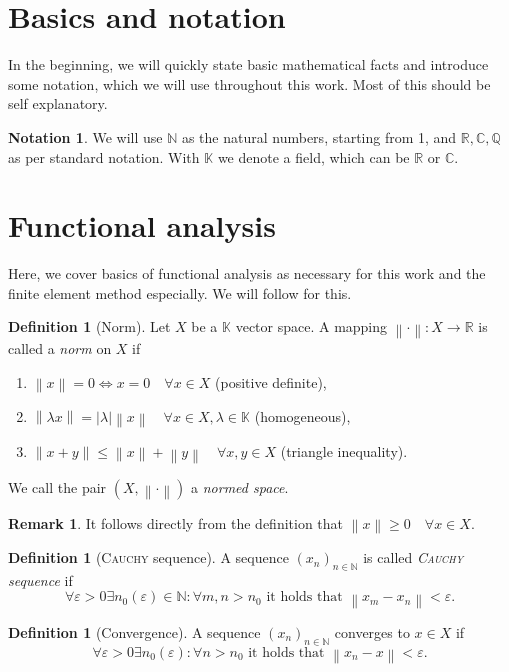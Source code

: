 \documentclass[12pt,a4paper,twoside, open=right]{scrreprt}
\theoremstyle{definition}
\newtheorem{rem}[auf]{Remark}
\newtheorem{defn}[auf]{Definition}
\newtheorem{notation}[auf]{Notation}
\theoremstyle{plain}
\newcommand{\abs}[1]{\left\vert #1\right\vert}
\newcommand{\rr}{\mathbb{R}}
\newcommand{\cc}{\mathbb{C}}
\newcommand{\kk}{\mathbb{K}}
\newcommand{\nn}{\mathbb{N}}
\newcommand{\qq}{\mathbb{Q}}
\newcommand{\norm}[1]{\left\lVert#1\right\rVert}
\begin{document}
\section{Basics and notation}
In the beginning, we will quickly state basic mathematical facts and introduce some notation, which we will use throughout this work. Most of this should be self explanatory.
\begin{notation}
    We will use $\nn$ as the natural numbers, starting from 1, and $\rr,\cc,\qq$ as per standard notation. With $\kk$ we denote a field, which can be $\rr$ or $\cc$.
\end{notation} 
\section{Functional analysis}
\label{sec:funcana}
Here, we cover basics of functional analysis as necessary for this work and the finite element method especially. We will follow \cite{Ganesan2017} for this.
\begin{defn}[Norm]
    Let $X$ be a $\kk$ vector space. A mapping $\norm{\cdot}\colon X\to\rr$ is called a \emph{norm} on $X$ if 
    \begin{enumerate}
        \item $\norm{x}=0 \Leftrightarrow x=0\quad \forall x\in X$ (positive definite),
        \item $\norm{\lambda x}=\abs{\lambda}\norm{x}\quad \forall x\in X,\lambda\in\kk$ (homogeneous),
        \item $\norm{x+y}\le\norm{x}+\norm{y}\quad\forall x,y\in X$ (triangle inequality).
    \end{enumerate}
    We call the pair $(X,\norm{\cdot})$ a \emph{normed space}.
\end{defn}
\begin{rem}
    It follows directly from the definition that $\norm{x}\ge 0 \quad\forall x\in X$.
\end{rem}
\begin{defn}[\textsc{Cauchy} sequence]
    A sequence $(x_n)_{n\in\nn}$ is called \emph{\textsc{Cauchy} sequence} if
    \begin{equation}
         \forall\varepsilon>0 \exists n_0(\varepsilon)\in\nn\colon \forall m,n>n_0\text{ it holds that }\norm{x_m-x_n}<\varepsilon.
    \end{equation}
\end{defn}
\begin{defn}[Convergence]
    A sequence $(x_n)_{n\in\nn}$ converges to $x\in X$ if 
    \begin{equation}
        \forall\varepsilon>0 \exists n_0(\varepsilon)\colon \forall n>n_0 \text{ it holds that } \norm{x_n -x}<\varepsilon.
    \end{equation}
\end{defn}
\end{document}
